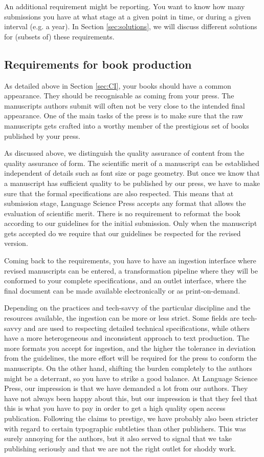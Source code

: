 \documentclass[nonflat,modfonts,output=book] {langsci/langscibook}
\begin{document}
An additional requirement might be reporting. You want to know how many submissions you have at what stage at a given point in time, or during a given interval (e.g. a year). In Section \ref{sec:solutions}, we will discuss different solutions for (subsets of) these requirements. 
 
 
\subsection{Requirements for book production}
As detailed above in Section \ref{sec:CI}, your books should have a common appearance. They should be recognisable as coming from your press. The manuscripts authors submit will often not be very close to the intended final appearance. One of the main tasks of the press is to make sure that the raw manuscripts gets crafted into a worthy member of the prestigious set of books published by your press. 

As discussed above, we distinguish the quality assurance of content from the quality assurance of form. The scientific merit of a manuscript can be established independent of details such as font size or page geometry. But once we know that a manuscript has sufficient quality to be published by our press, we have to make sure that the formal specifications are also respected. This means that at submission stage, Language Science Press accepts any format that allows the evaluation of scientific merit. There is no requirement to reformat the book according to our guidelines for the initial submission. Only when the manuscript gets accepted do we require that our guidelines be respected for the revised version. 

Coming back to the requirements, you have to have an ingestion interface where revised manuscripts can be entered, a transformation pipeline where they will be conformed to your complete specifications, and an outlet interface, where the final document can be made available electronically or as print-on-demand.

Depending on the practices and tech-savvy of the particular discipline and the resources available, the ingestion can be more or less strict. Some fields are tech-savvy and are used to respecting detailed technical specifications, while others have a more heterogeneous and inconsistent approach to text production. The more formats you accept for ingestion, and the higher the tolerance in deviation from the guidelines, the more effort will be required for the press to conform the manuscripts. On the other hand, shifting the burden completely to the authors might be a deterrant, so you have to strike a good balance. At Language Science Press, our impression is that we have demanded a lot from our authors. They have not always been happy about this, but our impression is that they feel that this is what you have to pay in order to get a high quality open access publication. Following the claims to prestige, we have probably also been stricter with regard to certain typographic subtleties than other publishers. This was surely annoying for the authors, but it also served to signal that we take publishing seriously and that we are not the right outlet for shoddy work. 
\end{document}
